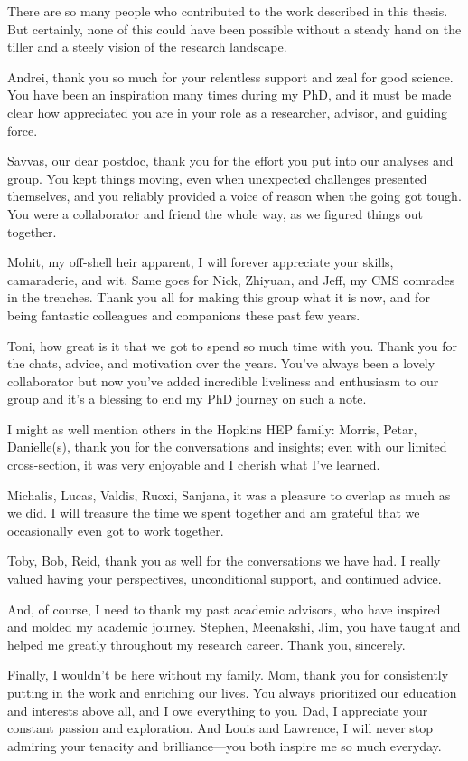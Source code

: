 

There are so many people who contributed to the work described in this thesis. But certainly, none of this could have been possible without a steady hand on the tiller and a steely vision of the research landscape. 

Andrei, thank you so much for your relentless support and zeal for good science. You have been an inspiration many times during my PhD, and it must be made clear how appreciated you are in your role as a researcher, advisor, and guiding force. 

Savvas, our dear postdoc, thank you for the effort you put into our analyses and group. You kept things moving, even when unexpected challenges presented themselves, and you reliably provided a voice of reason when the going got tough. You were a collaborator and friend the whole way, as we figured things out together. 

Mohit, my off-shell heir apparent, I will forever appreciate your skills, camaraderie, and wit. Same goes for Nick, Zhiyuan, and Jeff, my CMS comrades in the trenches. Thank you all for making this group what it is now, and for being fantastic colleagues and companions these past few years. 

Toni, how great is it that we got to spend so much time with you. Thank you for the chats, advice, and motivation over the years. You've always been a lovely collaborator but now you've added incredible liveliness and enthusiasm to our group and it's a blessing to end my PhD journey on such a note. 

I might as well mention others in the Hopkins HEP family: Morris, Petar, Danielle(s), thank you for the conversations and insights; even with our limited cross-section, it was very enjoyable and I cherish what I've learned. 

Michalis, Lucas, Valdis, Ruoxi, Sanjana, it was a pleasure to overlap as much as we did. I will treasure the time we spent together and am grateful that we occasionally even got to work together. 

Toby, Bob, Reid, thank you as well for the conversations we have had. I really valued having your perspectives, unconditional support, and continued advice. 

And, of course, I need to thank my past academic advisors, who have inspired and molded my academic journey. Stephen, Meenakshi, Jim, you have taught and helped me greatly throughout my research career. Thank you, sincerely.

Finally, I wouldn't be here without my family. Mom, thank you for consistently putting in the work and enriching our lives. You always prioritized our education and interests above all, and I owe everything to you. Dad, I appreciate your constant passion and exploration. And Louis and Lawrence, I will never stop admiring your tenacity and brilliance---you both inspire me so much everyday. 
